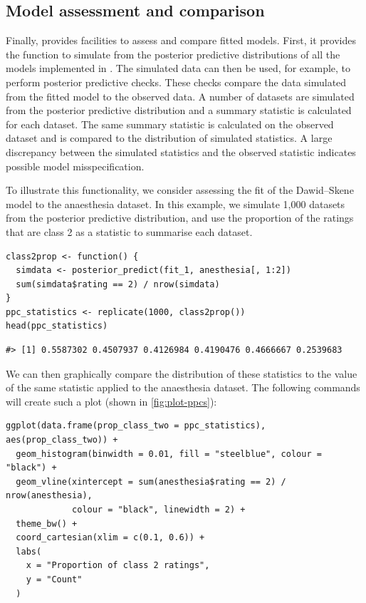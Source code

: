\hypertarget{sec:model-assessment-comparison}{%
\subsection{Model assessment and comparison}\label{sec:model-assessment-comparison}}

Finally,  provides facilities to assess and compare fitted
models. First, it provides the  function to simulate from
the posterior predictive distributions of all the models implemented in
. The simulated data can then be used, for example, to perform
posterior predictive checks. These checks compare the data
simulated from the fitted model to the observed data. A number of datasets
are simulated from the posterior predictive distribution and a summary statistic
is calculated for each dataset. The same summary statistic is calculated on the
observed dataset and is compared to the distribution of simulated statistics.
A large discrepancy between the simulated statistics and the observed statistic
indicates possible model misspecification.

To illustrate this functionality, we consider assessing the fit of the
Dawid--Skene model to the anaesthesia dataset. In this example, we simulate
1,000 datasets from the posterior predictive distribution, and use the
proportion of the ratings that are class 2 as a statistic to summarise each
dataset.

\begin{verbatim}
class2prop <- function() {
  simdata <- posterior_predict(fit_1, anesthesia[, 1:2])
  sum(simdata$rating == 2) / nrow(simdata)
}
ppc_statistics <- replicate(1000, class2prop())
head(ppc_statistics)
\end{verbatim}

\begin{verbatim}
#> [1] 0.5587302 0.4507937 0.4126984 0.4190476 0.4666667 0.2539683
\end{verbatim}

We can then graphically compare the distribution of these statistics to the
value of the same statistic applied to the anaesthesia dataset. The following
commands will create such a plot (shown in \autoref{fig:plot-ppcs}):

\begin{verbatim}
ggplot(data.frame(prop_class_two = ppc_statistics), aes(prop_class_two)) +
  geom_histogram(binwidth = 0.01, fill = "steelblue", colour = "black") +
  geom_vline(xintercept = sum(anesthesia$rating == 2) / nrow(anesthesia),
             colour = "black", linewidth = 2) +
  theme_bw() +
  coord_cartesian(xlim = c(0.1, 0.6)) +
  labs(
    x = "Proportion of class 2 ratings",
    y = "Count"
  )
\end{verbatim}

